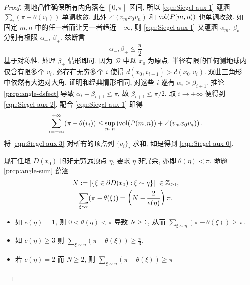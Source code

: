 \begin{proof}
	测地凸性确保所有内角落在 $[0, \pi]$ 区间, 所以 \eqref{eqn:Siegel-aux-1} 蕴涵 $\sum_i (\pi - \theta(v_i))$ 单调收敛. 此外 $\angle (v_m x_0 v_n)$ 和 $\operatorname{vol}(P(m,n))$ 也单调收敛. 如固定 $m,n$ 中的任一者而让另一者趋近 $\pm\infty$, 则 \eqref{eqn:Siegel-aux-1} 又蕴涵 $\alpha_m$, $\beta_n$ 分别有极限 $\alpha_-$, $\beta_+$. 兹断言
	\begin{equation}\label{eqn:Siegel-aux-2}
		\alpha_-, \beta_+ \leq \frac{\pi}{2}
	\end{equation}
	基于对称性, 处理 $\beta_+$ 情形即可. 因为 $\mathcal{D}$ 中以 $x_0$ 为原点, 半径有限的任何测地球内仅含有限多个 $v_i$, 必存在无穷多个 $i$ 使得 $d(x_0, v_{i+1}) > d(x_0, v_i)$. 双曲三角形中依然有大边对大角, 证明和经典情形相同, 对这些 $i$ 遂有 $\alpha_i > \beta_{i+1}$. 推论 \ref{prop:angle-defect} 导致 $\alpha_i + \beta_{i+1} \leq \pi$, 故 $\beta_{i+1} \leq \pi/2$. 取 $i \to +\infty$ 便得到 \eqref{eqn:Siegel-aux-2}. 配合 \eqref{eqn:Siegel-aux-1} 即得
	\begin{equation}\label{eqn:Siegel-aux-3}
		\sum_{i = -\infty}^{+\infty} (\pi - \theta(v_i)) \leq \sup_{m,n} \left(\operatorname{vol}(P(m,n)) + \angle(v_m x_0 v_n) \right).
	\end{equation}
	将 \eqref{eqn:Siegel-aux-3} 对所有的顶点列 $\{v_i\}_i$ 求和, 如是得到 \eqref{eqn:Siegel-aux-0}.
	
	现在任取 $D(x_0)$ 的非无穷远顶点 $\eta$, 要求 $\eta$ 非冗余, 亦即 $\theta(\eta) < \pi$. 命题 \ref{prop:angle-sum} 蕴涵
	\begin{equation*}\begin{gathered}
		N := \left| \left\{ \xi \in \partial D(x_0): \xi \sim \eta \right\}\right| \; \in \mathbb{Z}_{\geq 1}, \\
		\sum_{\xi \sim \eta} (\pi - \theta(\xi)) = \left(N - \frac{2}{e(\eta)}\right) \pi.
	\end{gathered}\end{equation*}
	\begin{itemize}
		\item 如 $e(\eta) = 1$, 则 $0 < \theta(\eta) < \pi$ 导致 $N \geq 3$, 从而 $\sum_{\xi \sim \eta} (\pi - \theta(\xi)) \geq \pi$.
		\item 如 $e(\eta) \geq 3$ 则 $\sum_{\xi \sim \eta} (\pi - \theta(\xi)) \geq \frac{\pi}{3}$.
		\item 若 $e(\eta) = 2$ 而 $N \geq 2$, 则 $\sum_{\xi \sim \eta} (\pi - \theta(\xi)) \geq \pi$
		

\end{itemize}
\end{proof}
